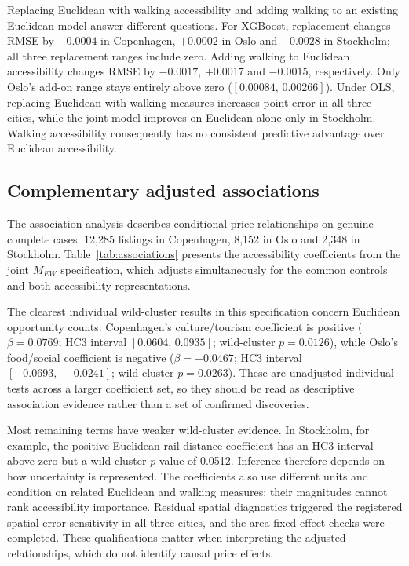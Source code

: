\documentclass[11pt,a4paper,oneside,openany]{memoir}
\begin{document}


Replacing Euclidean with walking accessibility and adding walking to an
existing Euclidean model answer different questions. For XGBoost, replacement
changes RMSE by $-0.0004$ in Copenhagen, $+0.0002$ in Oslo and $-0.0028$ in
Stockholm; all three replacement ranges include zero. Adding walking to
Euclidean accessibility changes RMSE by $-0.0017$, $+0.0017$ and $-0.0015$,
respectively. Only Oslo's add-on range stays entirely above zero
($[0.00084,\,0.00266]$). Under OLS, replacing Euclidean with walking measures
increases point error in all three cities, while the joint model improves on
Euclidean alone only in Stockholm. Walking accessibility consequently has no
consistent predictive advantage over Euclidean accessibility.

\subsection{Complementary adjusted associations}
\label{sec:rq2-associations}
The association analysis describes conditional price relationships on genuine
complete cases: 12,285 listings in Copenhagen, 8,152 in Oslo and 2,348 in
Stockholm. Table~\ref{tab:associations} presents the accessibility coefficients
from the joint $M_{EW}$ specification, which adjusts simultaneously for the
common controls and both accessibility representations.



The clearest individual wild-cluster results in this specification concern
Euclidean opportunity counts. Copenhagen's culture/tourism coefficient is
positive ($\beta=0.0769$; HC3 interval $[0.0604,\,0.0935]$; wild-cluster
$p=0.0126$), while Oslo's food/social coefficient is negative
($\beta=-0.0467$; HC3 interval $[-0.0693,\,-0.0241]$; wild-cluster $p=0.0263$).
These are unadjusted individual tests across a larger coefficient set, so they
should be read as descriptive association evidence rather than a set of
confirmed discoveries.

Most remaining terms have weaker wild-cluster evidence. In Stockholm, for
example, the positive Euclidean rail-distance coefficient has an HC3 interval
above zero but a wild-cluster $p$-value of 0.0512. Inference therefore depends
on how uncertainty is represented. The coefficients also use different units
and condition on related Euclidean and walking measures; their magnitudes
cannot rank accessibility importance. Residual spatial diagnostics triggered
the registered spatial-error sensitivity in all three cities, and the
area-fixed-effect checks were completed. These qualifications matter when
interpreting the adjusted relationships, which do not identify causal price
effects.
\end{document}

